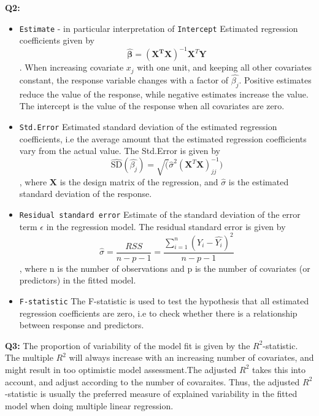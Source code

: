 \documentclass[]{article}
\begin{document}
\textbf{Q2:}

\begin{itemize}
\item
  \texttt{Estimate} - in particular interpretation of \texttt{Intercept}
  \newline  Estimated regression coefficients given by
  \[\hat{\mathbf{\beta}} = (\mathbf{X^T}\mathbf{X})^{-1}\mathbf{X}^T\mathbf{Y}\].
  \newline When increasing covariate \(x_j\) with one unit, and keeping
  all other covariates constant, the response variable changes with a
  factor of \(\hat{\beta_j}\). Positive estimates reduce the value of
  the response, while negative estimates increase the value. The
  intercept is the value of the response when all covariates are zero.
\item
  \texttt{Std.Error} \newline  Estimated standard deviation of the
  estimated regression coefficients, i.e the average amount that the
  estimated regression coefficients vary from the actual value. The
  Std.Error is given by
  \[\hat{\text{SD}}(\hat{\beta_j}) = \sqrt(\hat{\sigma}^2(\mathbf{X}^T\mathbf{X})^{-1}_{jj})\],
  where \(\mathbf{X}\) is the design matrix of the regression, and
  \(\hat{\sigma}\) is the estimated standard deviation of the response.
\item
  \texttt{Residual\ standard\ error} \newline
  Estimate of the standard deviation of the error term \(\epsilon\) in
  the regression model. The residual standard error is given by
  \[\hat{\sigma} = \frac{RSS}{n-p-1} = \frac{\sum_{i = 1}^n(Y_i - \hat{Y_i})^2}{n-p-1}\],
  where n is the number of observations and p is the number of
  covariates (or predictors) in the fitted model.
\item
  \texttt{F-statistic} \newline
  The F-statistic is used to test the hypothesis that all estimated
  regression coefficients are zero, i.e to check whether there is a
  relationship between response and predictors.
\end{itemize}

\textbf{Q3:} \newline  The proportion of variability of the model fit is
given by the \(R^2\)-statistic. The multiple \(R^2\) will always
increase with an increasing number of covariates, and might result in
too optimistic model assessment.The adjusted \(R^2\) takes this into
account, and adjust according to the number of covaraites. Thus, the
adjusted \(R^2\)-statistic is usually the preferred measure of explained
variability in the fitted model when doing multiple linear regression.
\end{document}
